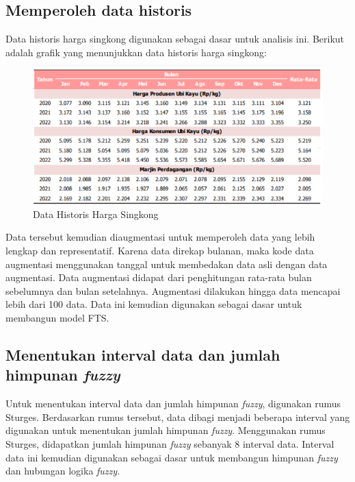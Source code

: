 \documentclass[conference]{IEEEtran}
\begin{document}
\subsection{Memperoleh data historis}
Data historis harga singkong digunakan sebagai dasar untuk analisis ini. Berikut adalah grafik yang menunjukkan data historis harga singkong:
\begin{figure}[H]
    \centering
    \includegraphics[scale=0.4]{images/Data Historis.png} 
    \caption{Data Historis Harga Singkong}
\end{figure}
Data tersebut kemudian diaugmentasi untuk memperoleh data yang lebih lengkap dan representatif. Karena data direkap bulanan, maka kode data augmentasi menggunakan tanggal untuk membedakan data asli dengan data augmentasi. Data augmentasi didapat dari penghitungan rata-rata bulan sebelumnya dan bulan setelahnya. Augmentasi dilakukan hingga data mencapai lebih dari 100 data. Data ini kemudian digunakan sebagai dasar untuk membangun model FTS.

\subsection{Menentukan interval data dan jumlah himpunan \textit{fuzzy}}

Untuk menentukan interval data dan jumlah himpunan \textit{fuzzy}, digunakan rumus Sturges. Berdasarkan rumus tersebut, data dibagi menjadi beberapa interval yang digunakan untuk menentukan jumlah himpunan \textit{fuzzy}. Menggunakan rumus Sturges, didapatkan jumlah himpunan \textit{fuzzy} sebanyak 8 interval data. Interval data ini kemudian digunakan sebagai dasar untuk membangun himpunan \textit{fuzzy} dan hubungan logika \textit{fuzzy}.
\end{document}
